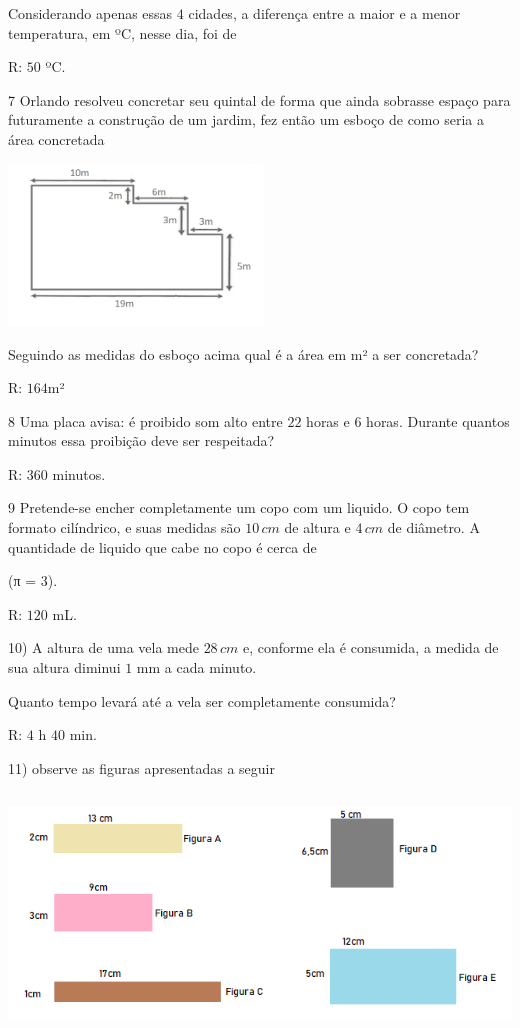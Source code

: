 Considerando apenas essas $4$ cidades, a diferença entre a maior e a menor
temperatura, em ºC, nesse dia, foi de

R: $50$ ºC.

\num{7}  Orlando resolveu concretar seu quintal de forma que ainda sobrasse
espaço para futuramente a construção de um jardim, fez então um esboço
de como seria a área concretada

\includegraphics[width=2.66667in,height=1.6914in]{./imgSAEB_6_MAT/media/image97.png}

Seguindo as medidas do esboço acima qual é a área em m² a ser
concretada?

R: $164$m²

\num{8}  Uma placa avisa: é proibido som alto entre $22$ horas e $6$ horas.
Durante quantos minutos essa proibição deve ser respeitada?

R: $360$ minutos.

\num{9}  Pretende-se encher completamente um copo com um liquido. O copo tem
formato cilíndrico, e suas medidas são $10\,cm$ de altura e $4\,cm$ de
diâmetro. A quantidade de liquido que cabe no copo é cerca de

(π = $3$).

R: $120$ mL.

10) A altura de uma vela mede $28\,cm$ e, conforme ela é consumida, a
medida de sua altura diminui $1$ mm a cada minuto.

Quanto tempo levará até a vela ser completamente consumida?

R: $4$ h $40$ min.

11) observe as figuras apresentadas a seguir

\includegraphics[width=5.90625in,height=2.51042in]{./imgSAEB_6_MAT/media/image98.png}

